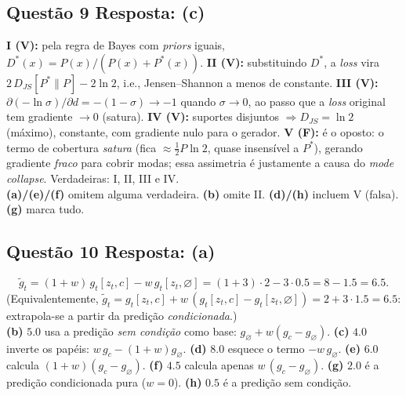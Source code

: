 \documentclass[11pt,a4paper]{article}
\begin{document}
\subsection*{Questão 9 \textemdash{} Resposta: (c)}
\textbf{I (V):} pela regra de Bayes com \textit{priors} iguais, $D^{*}(x) = P(x)/(P(x)+P^{*}(x))$.
\textbf{II (V):} substituindo $D^{*}$, a \emph{loss} vira $2\,D_{JS}[P^{*}\|P] - 2\ln 2$, i.e., Jensen--Shannon a menos de constante.
\textbf{III (V):} $\partial(-\ln\sigma)/\partial d = -(1-\sigma) \to -1$ quando $\sigma\to 0$, ao passo que a \emph{loss} original tem gradiente $\to 0$ (satura).
\textbf{IV (V):} suportes disjuntos $\Rightarrow D_{JS} = \ln 2$ (máximo), constante, com gradiente nulo para o gerador.
\textbf{V (F):} é o oposto: o termo de cobertura \emph{satura} (fica $\approx \tfrac{1}{2}P\ln 2$, quase insensível a $P^{*}$), gerando gradiente \emph{fraco} para cobrir modas; essa assimetria é justamente a causa do \textit{mode collapse}.
Verdadeiras: I, II, III e IV.\\
\textbf{(a)/(e)/(f)} omitem alguma verdadeira.
\textbf{(b)} omite II.
\textbf{(d)/(h)} incluem V (falsa).
\textbf{(g)} marca tudo.

\subsection*{Questão 10 \textemdash{} Resposta: (a)}
\[
\tilde{g}_t = (1 + w)\,g_t[z_t, c] - w\,g_t[z_t, \varnothing] = (1+3)\cdot 2 - 3\cdot 0.5 = 8 - 1.5 = 6.5.
\]
(Equivalentemente, $\tilde{g}_t = g_t[z_t,c] + w\,(g_t[z_t,c] - g_t[z_t,\varnothing]) = 2 + 3\cdot 1.5 = 6.5$: extrapola-se a partir da predição \emph{condicionada}.)\\
\textbf{(b)} $5.0$ usa a predição \emph{sem condição} como base: $g_\varnothing + w(g_c - g_\varnothing)$.
\textbf{(c)} $4.0$ inverte os papéis: $w\,g_c - (1+w)g_\varnothing$.
\textbf{(d)} $8.0$ esquece o termo $-w\,g_\varnothing$.
\textbf{(e)} $6.0$ calcula $(1+w)(g_c - g_\varnothing)$.
\textbf{(f)} $4.5$ calcula apenas $w\,(g_c - g_\varnothing)$.
\textbf{(g)} $2.0$ é a predição condicionada pura ($w = 0$).
\textbf{(h)} $0.5$ é a predição sem condição.

\color{black}
\end{document}
